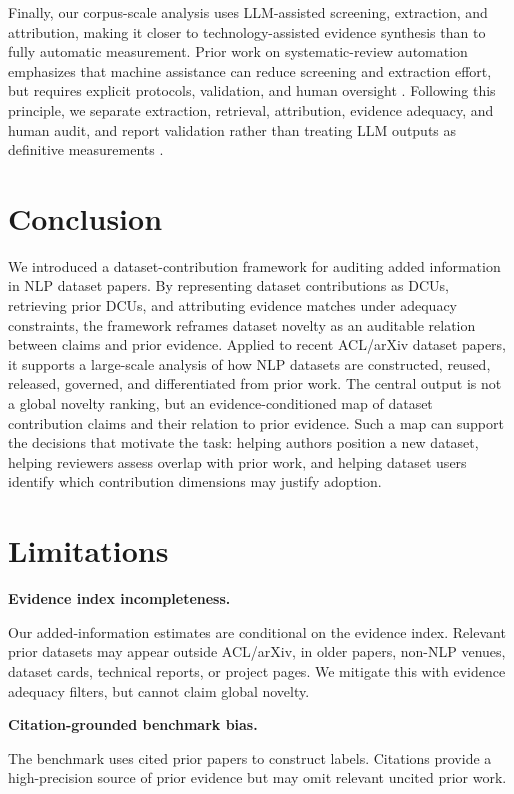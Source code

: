 \documentclass[11pt]{article}
\begin{document}
Finally, our corpus-scale analysis uses LLM-assisted screening, extraction, and attribution, making it closer to technology-assisted evidence synthesis than to fully automatic measurement.
Prior work on systematic-review automation emphasizes that machine assistance can reduce screening and extraction effort, but requires explicit protocols, validation, and human oversight \citep{marshall2019automation,thomas2011textmining,wang2024zeroshot}.
Following this principle, we separate extraction, retrieval, attribution, evidence adequacy, and human audit, and report validation rather than treating LLM outputs as definitive measurements \citep{bean2025construct,artstein2008intercoder}.
\section{Conclusion}
We introduced a dataset-contribution framework for auditing added information in NLP dataset papers.
By representing dataset contributions as DCUs, retrieving prior DCUs, and attributing evidence matches under adequacy constraints, the framework reframes dataset novelty as an auditable relation between claims and prior evidence.
Applied to recent ACL/arXiv dataset papers, it supports a large-scale analysis of how NLP datasets are constructed, reused, released, governed, and differentiated from prior work.
The central output is not a global novelty ranking, but an evidence-conditioned map of dataset contribution claims and their relation to prior evidence. 
Such a map can support the decisions that motivate the task: helping authors position a new dataset, helping reviewers assess overlap with prior work, and helping dataset users identify which contribution dimensions may justify adoption.
\section{Limitations}

\smallskip\noindent\textbf{Evidence index incompleteness.}\par\noindent
Our added-information estimates are conditional on the evidence index.
Relevant prior datasets may appear outside ACL/arXiv, in older papers, non-NLP venues, dataset cards, technical reports, or project pages.
We mitigate this with evidence adequacy filters, but cannot claim global novelty.

\smallskip\noindent\textbf{Citation-grounded benchmark bias.}\par\noindent
The benchmark uses cited prior papers to construct labels.
Citations provide a high-precision source of prior evidence but may omit relevant uncited prior work.
\end{document}
